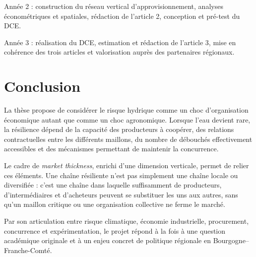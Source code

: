 \documentclass[11pt,a4paper]{article}
\begin{document}
Année 2 : construction du réseau vertical d'approvisionnement, analyses économétriques et spatiales, rédaction de l'article 2, conception et pré-test du DCE.

Année 3 : réalisation du DCE, estimation et rédaction de l'article 3, mise en cohérence des trois articles et valorisation auprès des partenaires régionaux.

\section{Conclusion}

La thèse propose de considérer le risque hydrique comme un choc d'organisation économique autant que comme un choc agronomique. Lorsque l'eau devient rare, la résilience dépend de la capacité des producteurs à coopérer, des relations contractuelles entre les différents maillons, du nombre de débouchés effectivement accessibles et des mécanismes permettant de maintenir la concurrence.

Le cadre de \textit{market thickness}, enrichi d'une dimension verticale, permet de relier ces éléments. Une chaîne résiliente n'est pas simplement une chaîne locale ou diversifiée : c'est une chaîne dans laquelle suffisamment de producteurs, d'intermédiaires et d'acheteurs peuvent se substituer les uns aux autres, sans qu'un maillon critique ou une organisation collective ne ferme le marché.

Par son articulation entre risque climatique, économie industrielle, procurement, concurrence et expérimentation, le projet répond à la fois à une question académique originale et à un enjeu concret de politique régionale en Bourgogne--Franche-Comté.



\end{document}
